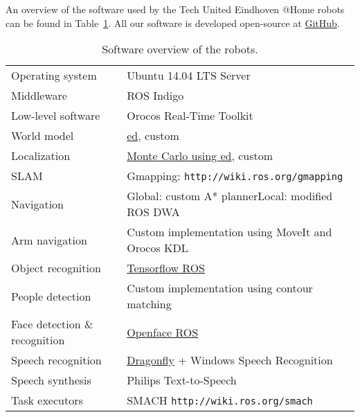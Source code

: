 An overview of the software used by the Tech United Eindhoven @Home robots can be found in Table~\ref{tab:softwarespec}.
All our software is developed open-source at \href{https://github.com/tue-robotics}{GitHub}.
\begin{table}[h]
    \begin{center}
    \caption{Software overview of the robots.}
    \label{tab:softwarespec}
    \vspace{-0.1cm}
    \renewcommand{\arraystretch}{1.0}
    \setlength{\tabcolsep}{5pt}
        \begin{tabular}{p{} p{}}
        	\toprule
            Operating system & Ubuntu 14.04 LTS Server\\

            Middleware & ROS Indigo \\

            Low-level software & Orocos Real-Time Toolkit\\

            World model & \href{https://github.com/tue-robotics/ed}{\acrfull{ed}}, custom \\

            Localization & \href{https://github.com/tue-robotics/ed_localization}{Monte Carlo using \gls{ed}}, custom \\

            SLAM & Gmapping: \texttt{http://wiki.ros.org/gmapping}\\

            Navigation & Global: custom A* planner\newline Local: modified ROS DWA \\

            Arm navigation & Custom implementation using MoveIt and Orocos KDL\\

            Object recognition & \href{https://github.com/tue-robotics/image_recognition/tree/master/tensorflow_ros}{Tensorflow ROS} \\

            People detection & Custom implementation using contour matching \\
            Face detection \& recognition & \href{https://github.com/tue-robotics/image_recognition/tree/master/openface_ros}{Openface ROS} \\
            Speech recognition & \href{http://code.google.com/p/dragonfly/}{Dragonfly} + Windows Speech Recognition\\
            Speech synthesis & Philips Text-to-Speech\\
            Task executors & SMACH \texttt{http://wiki.ros.org/smach}\\
            \bottomrule
        \end{tabular}
    \end{center}
\end{table}
